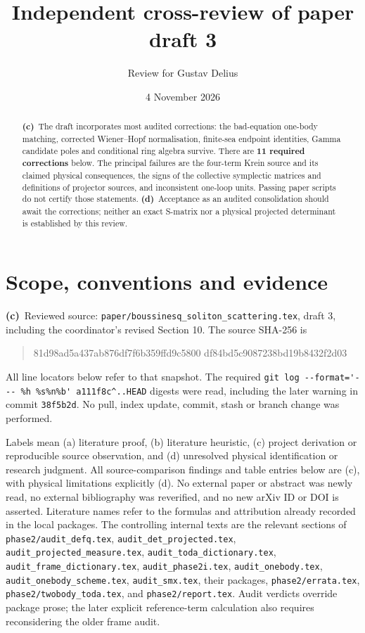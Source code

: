 \documentclass[11pt,a4paper]{article}
\title{Independent cross-review of paper draft 3}
\author{Review for Gustav Delius}
\date{4 November 2026}
\newcommand{\C}{\textbf{(c)}\ }
\newcommand{\D}{\textbf{(d)}\ }
\newcommand{\file}[1]{\nolinkurl{#1}}
\begin{document}
\maketitle

\begin{abstract}
\C The draft incorporates most audited corrections: the bad-equation
one-body matching, corrected Wiener--Hopf normalisation, finite-sea endpoint
identities, Gamma candidate poles and conditional ring algebra survive.
There are \textbf{11 required corrections} below. The principal failures are
the four-term Krein source and its claimed physical consequences, the signs
of the collective symplectic matrices and definitions of projector sources,
and inconsistent one-loop units. Passing paper scripts do not certify those
statements. \D Acceptance as an audited consolidation should await the
corrections; neither an exact S-matrix nor a physical projected determinant
is established by this review.
\end{abstract}

\section{Scope, conventions and evidence}
\C Reviewed source: \file{paper/boussinesq_soliton_scattering.tex}, draft 3,
including the coordinator's revised Section 10. The source SHA-256 is
\begin{quote}\small\ttfamily
81d98ad5a437ab876df7f6b359ffd9c5800\newline
df84bd5c9087238bd19b8432f2d03
\end{quote}
All line locators below refer to that snapshot. The required
\file{git log --format='--- \%h \%s\%n\%b' a111f8c^..HEAD}
digests were read, including the later warning in commit \file{38f5b2d}.
No pull, index update, commit, stash or branch change was performed.

Labels mean (a) literature proof, (b) literature heuristic, (c) project
derivation or reproducible source observation, and (d) unresolved physical
identification or research judgment. All source-comparison findings and table
entries below are (c), with physical limitations explicitly (d).
No external paper or abstract was newly read, no external bibliography was
reverified, and no new arXiv ID or DOI is asserted. Literature names refer
to the formulas and attribution already recorded in the local packages.
The controlling internal texts are the relevant sections of
\file{phase2/audit_defq.tex}, \file{audit_det_projected.tex},
\file{audit_projected_measure.tex}, \file{audit_toda_dictionary.tex},
\file{audit_frame_dictionary.tex}, \file{audit_phase2i.tex},
\file{audit_onebody.tex}, \file{audit_onebody_scheme.tex},
\file{audit_smx.tex}, their packages, \file{phase2/errata.tex},
\file{phase2/twobody_toda.tex}, and \file{phase2/report.tex}.
Audit verdicts override package prose; the later explicit reference-term
calculation also requires reconsidering the older frame audit.
\end{document}
